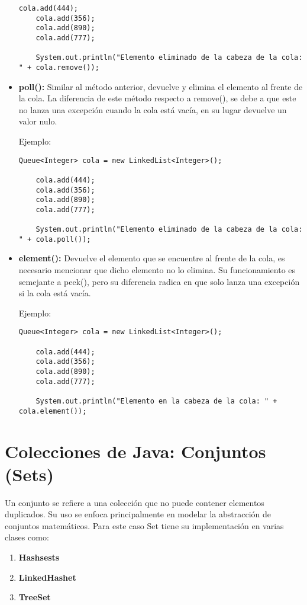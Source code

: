 \documentclass[12pt, letterpaper]{article} %
\begin{document}
\begin{itemize}
\begin{lstlisting}[frame=single]
    cola.add(444);
    cola.add(356);
    cola.add(890);
    cola.add(777);

    System.out.println("Elemento eliminado de la cabeza de la cola: " + cola.remove());
    \end{lstlisting}

    \item \textbf{poll():} Similar al método anterior, devuelve y elimina el elemento al frente de la cola. La diferencia de este método respecto a remove(), se debe a que este no lanza una excepción cuando la cola está vacía, en su lugar devuelve un valor nulo.
    
    Ejemplo:
    \lstset{language = Java, breaklines=true, basicstyle=\footnotesize}
    \begin{lstlisting}[frame=single]
    Queue<Integer> cola = new LinkedList<Integer>();

    cola.add(444);
    cola.add(356);
    cola.add(890);
    cola.add(777);

    System.out.println("Elemento eliminado de la cabeza de la cola: " + cola.poll());
    \end{lstlisting}

    \item \textbf{element():} Devuelve el elemento que se encuentre al frente de la cola, es necesario mencionar que dicho elemento no lo elimina. Su funcionamiento es semejante a peek(), pero su diferencia radica en que solo lanza una excepción si la cola está vacía.
    
    Ejemplo:
    \lstset{language = Java, breaklines=true, basicstyle=\footnotesize}
    \begin{lstlisting}[frame=single]
    Queue<Integer> cola = new LinkedList<Integer>();

    cola.add(444);
    cola.add(356);
    cola.add(890);
    cola.add(777);
    
    System.out.println("Elemento en la cabeza de la cola: " + cola.element());
    \end{lstlisting}
\end{itemize}

\section{Colecciones de Java: Conjuntos (Sets)}
Un conjunto se refiere a una colección que no puede contener elementos duplicados. Su uso se enfoca principalmente en modelar la abstracción de conjuntos matemáticos. Para este caso Set tiene su implementación en varias clases como:
\begin{enumerate}
    \item \textbf{Hashsests}
    \item \textbf{LinkedHashet}
    \item \textbf{TreeSet}
\end{enumerate}
\end{document}
